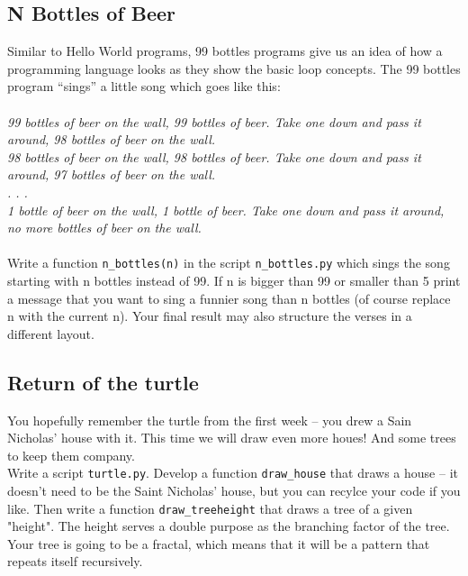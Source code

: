 \subsection{N Bottles of Beer}
Similar to Hello World programs, 99 bottles programs give us an idea of how
a programming language looks as they show the basic loop concepts.
The 99 bottles program “sings” a little song which goes like this:\\\\
\textit{
99 bottles of beer on the wall, 99 bottles of beer. Take one down and
pass it around, 98 bottles of beer on the wall.\\
98 bottles of beer on the wall, 98 bottles of beer. Take one down and
pass it around, 97 bottles of beer on the wall.\\
. . .\\
1 bottle of beer on the wall, 1 bottle of beer. Take one down and
pass it around, no more bottles of beer on the wall.\\\\
}
Write a function \texttt{n\_bottles(n)} in the script \texttt{n\_bottles.py} which
sings the song starting with n bottles instead of 99. If n is bigger than 99 or
smaller than 5 print a message that you want to sing a funnier song than n bottles
(of course replace n with the current n). Your final result may also structure
the verses in a different layout.

\cprotect{}


\subsection{Return of the turtle}
\FloatBarrier
You hopefully remember the turtle from the first week -- you drew a Sain Nicholas' house with it.
This time we will draw even more houes! And some trees to keep them company.\\
Write a script \texttt{turtle.py}. Develop a function \texttt{draw\_house} that draws a house -- 
it doesn't need to be the Saint Nicholas' house, but you can recylce your code if you like.
Then write a function \texttt{draw\_tree{height}} that draws a tree of a given "height".
The height serves a double purpose as the branching factor of the tree. Your tree is going to be a fractal,
which means that it will be a pattern that repeats itself recursively.


